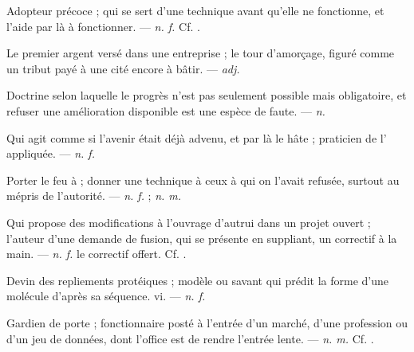  Adopteur précoce ; qui se sert d'une technique avant qu'elle ne fonctionne, et l'aide par là à fonctionner. ---  \textit{n. f.} Cf. .

 Le premier argent versé dans une entreprise ; le tour d'amorçage, figuré comme un tribut payé à une cité encore à bâtir.   ---  \textit{adj.}

 Doctrine selon laquelle le progrès n'est pas seulement possible mais obligatoire, et refuser une amélioration disponible est une espèce de faute. ---  \textit{n.}

 Qui agit comme si l'avenir était déjà advenu, et par là le hâte ; praticien de l' appliquée. ---  \textit{n. f.}

 Porter le feu à ; donner une technique à ceux à qui on l'avait refusée, surtout au mépris de l'autorité. ---  \textit{n. f.} ;  \textit{n. m.}

 Qui propose des modifications à l'ouvrage d'autrui dans un projet ouvert ; l'auteur d'une demande de fusion, qui se présente en suppliant, un correctif à la main. ---  \textit{n. f.} le correctif offert. Cf. .

 Devin des repliements protéiques ; modèle ou savant qui prédit la forme d'une molécule d'après sa séquence.   vi. ---  \textit{n. f.}

 Gardien de porte ; fonctionnaire posté à l'entrée d'un marché, d'une profession ou d'un jeu de données, dont l'office est de rendre l'entrée lente. ---  \textit{n. m.} Cf. .

